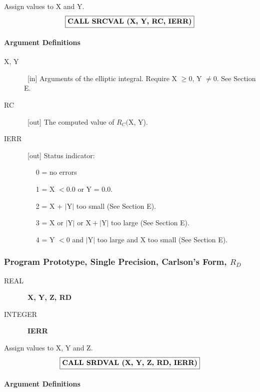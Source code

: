 \documentclass[twoside]{MATH77}
\begin{document}
Assign values to X and Y.
$$
\fbox{\bf CALL SRCVAL (X, Y, RC, IERR)}
$$
\paragraph{Argument Definitions}

\begin{description}
\item[X, Y]  \ [in] Arguments of the elliptic integral. Require X $\geq 0$,
Y $\neq 0$. See Section E.

\item[RC]  \ [out] The computed value of $R_C($X, Y).

\item[IERR]  \ [out] Status indicator:

\begin{itemize}
\item[0 =]  no errors

\item[1 =]  X $<0.0$ or Y = 0.0.

\item[2 =]  X + $|\text{Y}|$ too small (See Section E).

\item[3 =]  X or $|\text{Y}|\text{ or X} +|\text{Y}|$ too large (See Section E).

\item[4 =]  Y $<0$ and $|\text{Y}|$ too large and X too small (See Section
E).
\end{itemize}
\end{description}

\subsubsection{Program Prototype, Single Precision, Carlson's Form, $R_D$}

\begin{description}
\item[REAL]  \ {\bf X, Y, Z, RD}

\item[INTEGER]  \ {\bf IERR}
\end{description}

Assign values to X, Y and Z.
$$
\fbox{\bf CALL SRDVAL (X, Y, Z, RD, IERR)}
$$
\paragraph{Argument Definitions}
\end{document}
